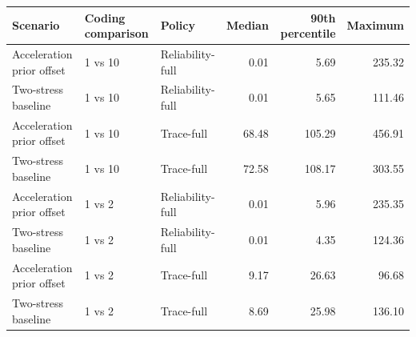 \begin{tabular}{lllrrr}
\toprule
Scenario & Coding comparison & Policy & Median & 90th percentile & Maximum \\
\midrule
Acceleration prior offset & 1 vs 10 & Reliability-full & 0.01 & 5.69 & 235.32 \\
Two-stress baseline & 1 vs 10 & Reliability-full & 0.01 & 5.65 & 111.46 \\
Acceleration prior offset & 1 vs 10 & Trace-full & 68.48 & 105.29 & 456.91 \\
Two-stress baseline & 1 vs 10 & Trace-full & 72.58 & 108.17 & 303.55 \\
Acceleration prior offset & 1 vs 2 & Reliability-full & 0.01 & 5.96 & 235.35 \\
Two-stress baseline & 1 vs 2 & Reliability-full & 0.01 & 4.35 & 124.36 \\
Acceleration prior offset & 1 vs 2 & Trace-full & 9.17 & 26.63 & 96.68 \\
Two-stress baseline & 1 vs 2 & Trace-full & 8.69 & 25.98 & 136.10 \\
\bottomrule
\end{tabular}
